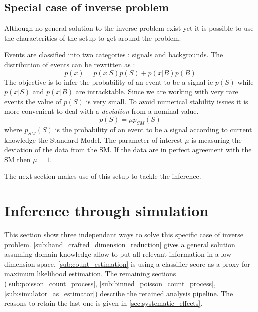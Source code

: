 \subsection{Special case of inverse problem} %
\label{sub:special_case_of_inverse_problem}

Although no general solution to the inverse problem exist yet it is possible to use the characteritics of the setup to get around the problem.

Events are classified into two categories : signals and backgrounds.
The distribution of events can be rewritten as :
\begin{equation}
 	p(x) = p(x|S) p(S) + p(x|B) p(B)
\end{equation}
The objective is to infer the probability of an event to be a signal ie $p(S)$ while $p(x|S)$ and $p(x|B)$ are intracktable.
Since we are working with very rare events the value of $p(S)$ is very small.
To avoid numerical stability issues it is more convenient to deal with a \emph{deviation} from a nominal value.
\begin{equation}
\label{eq:mu_definition}
	p(S) = \mu p_{SM}(S)
\end{equation}
where $p_{SM}(S)$ is the probability of an event to be a signal according to current knowledge \ie the Standard Model.
The parameter of interest $\mu$ is measuring the deviation of the data from the SM.
If the data are in perfect agreement with the SM then $\mu=1$.

The next section makes use of this setup to tackle the inference.






\section{Inference through simulation} %
\label{sec:inference_through_simulation}






This section show three independant ways to solve this specific case of inverse problem.
\autoref{sub:hand_crafted_dimension_reduction} gives a general solution assuming domain knowledge allow to put all relevant information in a low dimension space.
\autoref{sub:count_estimation} is using a classifier score as a proxy for maximum likelihood estimation.
The remaining sections (\autoref{sub:poisson_count_process}, \autoref{sub:binned_poisson_count_process}, \autoref{sub:simulator_as_estimator}) describe the retained analysis pipeline.
The reasons to retain the last one is given in \autoref{sec:systematic_effects}.









